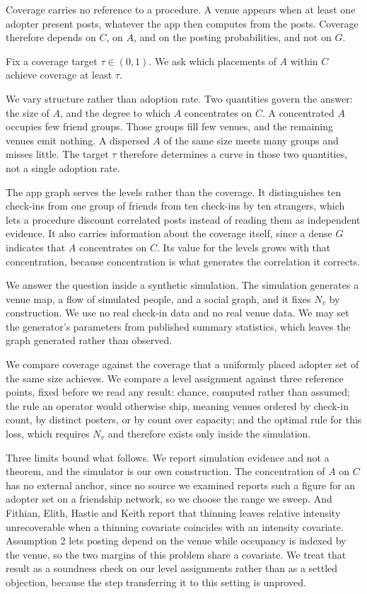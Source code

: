 Coverage carries no reference to a procedure. A venue appears when at least one adopter present
posts, whatever the app then computes from the posts. Coverage therefore depends on $C$, on $A$,
and on the posting probabilities, and not on $G$.

\begin{definition}
Fix a coverage target $\tau \in (0,1)$. We ask which placements of $A$ within $C$ achieve
coverage at least $\tau$.
\end{definition}

We vary structure rather than adoption rate. Two quantities govern the answer: the size of $A$,
and the degree to which $A$ concentrates on $C$. A concentrated $A$ occupies few friend groups.
Those groups fill few venues, and the remaining venues emit nothing. A dispersed $A$ of the same
size meets many groups and misses little. The target $\tau$ therefore determines a curve in those
two quantities, not a single adoption rate.

The app graph serves the levels rather than the coverage. It distinguishes ten check-ins from one
group of friends from ten check-ins by ten strangers, which lets a procedure discount correlated
posts instead of reading them as independent evidence. It also carries information about the
coverage itself, since a dense $G$ indicates that $A$ concentrates on $C$. Its value for the
levels grows with that concentration, because concentration is what generates the correlation it
corrects.

We answer the question inside a synthetic simulation. The simulation generates a venue map, a
flow of simulated people, and a social graph, and it fixes $N_v$ by construction. We use no real
check-in data and no real venue data. We may set the generator's parameters from published
summary statistics, which leaves the graph generated rather than observed.

We compare coverage against the coverage that a uniformly placed adopter set of the same size
achieves. We compare a level assignment against three reference points, fixed before we read any
result: chance, computed rather than assumed; the rule an operator would otherwise ship, meaning
venues ordered by check-in count, by distinct posters, or by count over capacity; and the optimal
rule for this loss, which requires $N_v$ and therefore exists only inside the simulation.

Three limits bound what follows. We report simulation evidence and not a theorem, and the
simulator is our own construction. The concentration of $A$ on $C$ has no external anchor, since
no source we examined reports such a figure for an adopter set on a friendship network, so we
choose the range we sweep. And Fithian, Elith, Hastie and Keith report that thinning leaves
relative intensity unrecoverable when a thinning covariate coincides with an intensity covariate. Assumption 2 lets
posting depend on the venue while occupancy is indexed by the venue, so the two margins of this
problem share a covariate. We treat that result as a soundness check on our level assignments
rather than as a settled objection, because the step transferring it to this setting is unproved.
